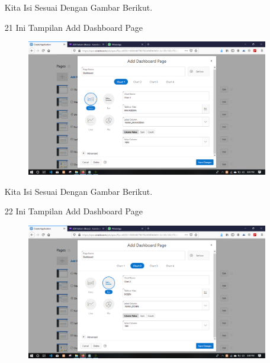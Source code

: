 \begin{enumerate}
\par
Kita Isi Sesuai Dengan Gambar Berikut.

\newpage
\item[21]Ini Tampilan Add Dashboard Page

\begin{figure}[!htbp]
    \begin{center}
    \includegraphics[scale=0.2]{figures/24.png}
    \end{center}   
    \end{figure}
    
\par
Kita Isi Sesuai Dengan Gambar Berikut.

\item[22]Ini Tampilan Add Dashboard Page

\begin{figure}[!htbp]
    \begin{center}
    \includegraphics[scale=0.2]{figures/25.png}
    \end{center}   
    \end{figure}
    

\end{enumerate}
